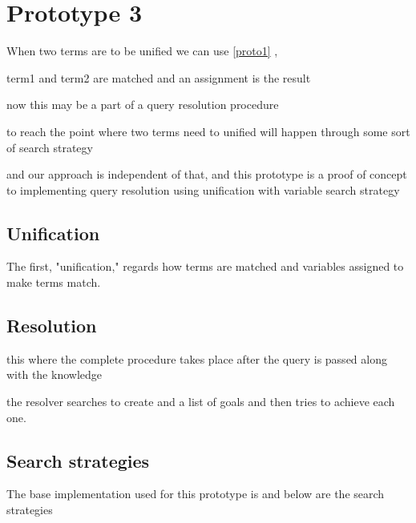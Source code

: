 \documentclass[thesis-solanki.tex]{files}
\begin{document}
\chapter{Prototype 3}{\label{proto3}}



When two terms are to be unified we can use \ref{proto1} ,

term1 and term2 are matched and an assignment is the result 

now this may be a part of a query resolution procedure

to reach the point where two terms need to unified will happen through some sort of search strategy

and our approach is independent of that, and this prototype is a proof of concept to implementing query resolution using unification with
variable search strategy


\section{Unification}
The first, "unification," regards how terms are matched and variables assigned to make terms match. \cite{website:prologunification}



\section{Resolution}
this where the complete procedure takes place after the query is passed along with the knowledge 

the resolver searches to create and a list of  goals and then tries to achieve each one.

\cite{website:prologresolution}


\section{Search strategies}
The base implementation used for this prototype  is \cite{website:mini-prolog-hugs98} and below are the search strategies 
\end{document}
